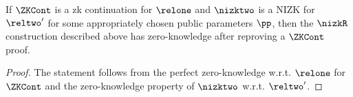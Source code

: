 \begin{lemma} 
	\label{le:specialZK_for_nizkR}
	If $\ZKCont$ is a zk continuation for $\relone$ and $\nizktwo$ is a NIZK for $\reltwo'$ for some appropriately chosen public parameters $\pp$, 
	then the $\nizkR$ construction described above has zero-knowledge after reproving a $\ZKCont$ proof.
\end{lemma} 
\begin{proof} The statement follows from the perfect zero-knowledge w.r.t. $\relone$ for $\ZKCont$ and 
	the zero-knowledge property of $\nizktwo$ w.r.t. $\reltwo'$.
\end{proof}

